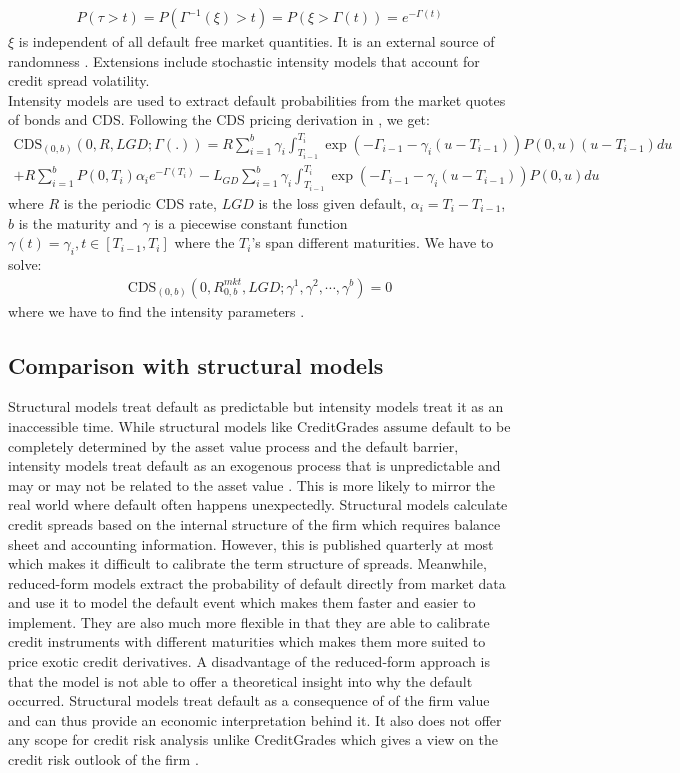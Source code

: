 \documentclass[11t,a4paper]{article}
\begin{document}
\begin{align} P(\tau > t) = P(\Gamma^{-1}(\xi) >t) = P(\xi > \Gamma(t)) = e^{-\Gamma(t)} \end{align}
$\xi$ is independent of all default free market quantities. It is an external source of randomness \cite{intlecnotes}. Extensions include stochastic intensity models that account for credit spread volatility.\\
Intensity models are used to extract default probabilities from the market quotes of bonds and CDS. Following the CDS pricing derivation in \cite{Brigobook}, we get:
\begin{multline}
\text{CDS}_{(0,b)}(0, R, LGD; \Gamma(.)) = R\sum^{b}_{i=1} \gamma_i \int^{T_i}_{T_{i-1}} \exp(-\Gamma_{i-1}-\gamma_i(u-T_{i-1})) P(0,u)(u-T_{i-1})du \\
+ R \sum^{b}_{i=1}P(0,T_i)\alpha_ie^{-\Gamma(T_i)} - L_{GD}\sum^{b}_{i=1} \gamma_i \int^{T_i}_{T_{i-1}} \exp(-\Gamma_{i-1}-\gamma_i(u-T_{i-1}))P(0,u)du 
\end{multline}
where $R$ is the periodic CDS rate, $LGD$ is the loss given default, $\alpha_i=T_i-T_{i-1}$, $b$ is the maturity and $\gamma$ is a piecewise constant function $\gamma(t) = \gamma_i, t\in[T_{i-1},T_i]$ where the $T_i$'s span different maturities. We have to solve:
\begin{align}
    \text{CDS}_{(0,b)}(0, R^{mkt}_{0,b}, LGD; \gamma^1, \gamma^2,\cdots,\gamma^b) = 0
\end{align}
where we have to find the intensity parameters \cite{Brigobook}. 

\subsection{Comparison with structural models}
Structural models treat default as predictable but intensity models treat it as an inaccessible time. While structural models like CreditGrades assume default to be completely determined by the asset value process and the default barrier, intensity models treat default as an exogenous process that is unpredictable and may or may not be related to the asset value \cite {comparison}. This is more likely to mirror the real world where default often happens unexpectedly. Structural models calculate credit spreads based on the internal structure of the firm which requires balance sheet and accounting information. However, this is published quarterly at most which makes it difficult to calibrate the term structure of spreads. Meanwhile, reduced-form models extract the probability of default directly from market data and use it to model the default event which makes them faster and easier to implement. They are also much more flexible in that they are able to calibrate credit instruments with different maturities which makes them more suited to price exotic credit derivatives. A disadvantage of the reduced-form approach is that the model is not able to offer a theoretical insight into why the default occurred. Structural models treat default as a consequence of of the firm value and can thus provide an economic interpretation behind it.  It also does not offer any scope for credit risk analysis unlike CreditGrades which gives a view on the credit risk outlook of the firm \cite{cgtechdoc}. 
\end{document}

